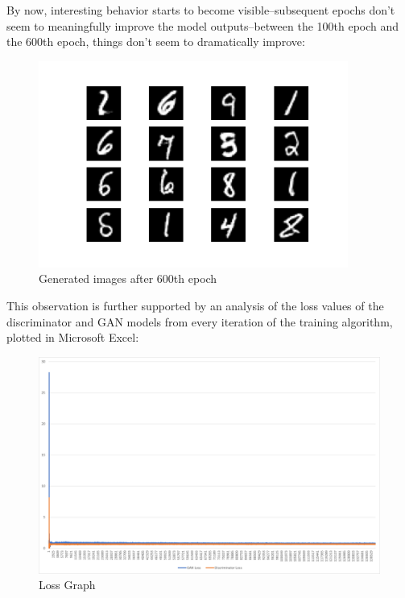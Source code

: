 \documentclass{article}
\begin{document}
\par By now, interesting behavior starts to become visible--subsequent epochs don't seem to meaningfully improve the model outputs--between the 100th epoch and the 600th epoch, things don't seem to dramatically improve:

\begin{figure}[H]
    \centering
    \includegraphics[width=4in]{csci-8110/hw-4/images/generated_plot_e600.png}
    \caption{Generated images after 600th epoch}
    \label{fig:ep600}
\end{figure}

\par This observation is further supported by an analysis of the loss values of the discriminator and GAN models from every iteration of the training algorithm, plotted in Microsoft Excel:

\begin{figure}[H]
    \centering
    \includegraphics[width=6in]{csci-8110/hw-4/images/8110_hw4_loss.png}
    \caption{Loss Graph}
    \label{fig:loss_graph}
\end{figure}
\end{document}
